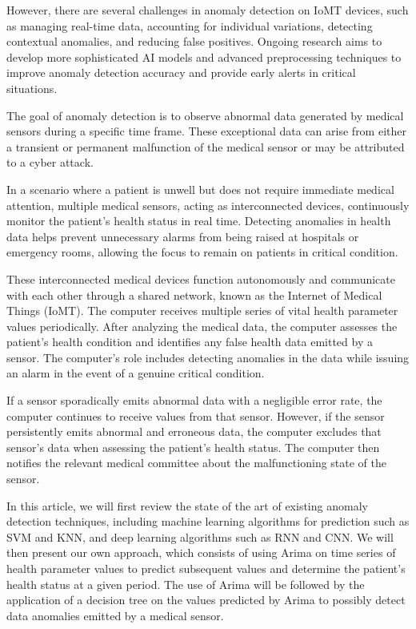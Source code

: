 \documentclass[conference]{IEEEtran}
\begin{document}
However, there are several challenges in anomaly detection on IoMT devices, such as managing real-time data, accounting for individual variations, detecting contextual anomalies, and reducing false positives. Ongoing research aims to develop more sophisticated AI models and advanced preprocessing techniques to improve anomaly detection accuracy and provide early alerts in critical situations.

The goal of anomaly detection is to observe abnormal data generated by medical sensors during a specific time frame. These exceptional data can arise from either a transient or permanent malfunction of the medical sensor or may be attributed to a cyber attack.

In a scenario where a patient is unwell but does not require immediate medical attention, multiple medical sensors, acting as interconnected devices, continuously monitor the patient's health status in real time. Detecting anomalies in health data helps prevent unnecessary alarms from being raised at hospitals or emergency rooms, allowing the focus to remain on patients in critical condition.

These interconnected medical devices function autonomously and communicate with each other through a shared network, known as the Internet of Medical Things (IoMT). The computer receives multiple series of vital health parameter values periodically. After analyzing the medical data, the computer assesses the patient's health condition and identifies any false health data emitted by a sensor. The computer's role includes detecting anomalies in the data while issuing an alarm in the event of a genuine critical condition.

If a sensor sporadically emits abnormal data with a negligible error rate, the computer continues to receive values from that sensor. However, if the sensor persistently emits abnormal and erroneous data, the computer excludes that sensor's data when assessing the patient's health status. The computer then notifies the relevant medical committee about the malfunctioning state of the sensor.

In this article, we will first review the state of the art of existing anomaly detection techniques, including machine learning algorithms for prediction such as SVM and KNN, and deep learning algorithms such as RNN and CNN. We will then present our own approach, which consists of using Arima on time series of health parameter values to predict subsequent values and determine the patient's health status at a given period. The use of Arima will be followed by the application of a decision tree on the values predicted by Arima to possibly detect data anomalies emitted by a medical sensor.
\end{document}
